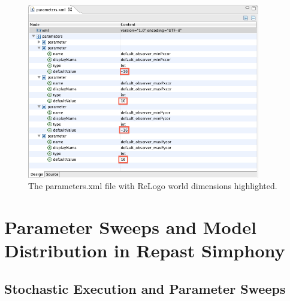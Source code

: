 \documentclass[11pt]{amsart}
\begin{document}
\begin{figure}
\begin{center}
\vspace{.2in}
\centerline {
\includegraphics[width=4in]{GettingStartedImages/WorldDimensions.png}
}
\caption{The parameters.xml file with ReLogo world dimensions highlighted.}
\label{fig:worlddims}
\end{center}
\end{figure}

\clearpage



%

\clearpage
\section{Parameter Sweeps and Model Distribution in Repast Simphony}

\subsection{Stochastic Execution and Parameter Sweeps}
\end{document}
